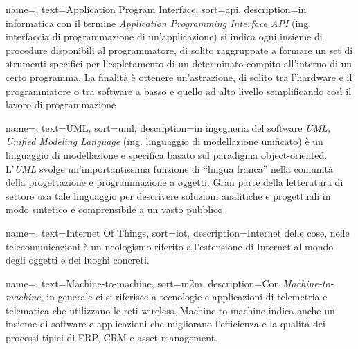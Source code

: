 
\renewcommand{\acronymname}{Acronimi e abbreviazioni}






{
    name=,
    text=Application Program Interface,
    sort=api,
    description={in informatica con il termine \emph{Application Programming Interface API} (ing. interfaccia di programmazione di un'applicazione) si indica ogni insieme di procedure disponibili al programmatore, di solito raggruppate a formare un set di strumenti specifici per l'espletamento di un determinato compito all'interno di un certo programma. La finalità è ottenere un'astrazione, di solito tra l'hardware e il programmatore o tra software a basso e quello ad alto livello semplificando così il lavoro di programmazione}
}

{
    name=,
    text=UML,
    sort=uml,
    description={in ingegneria del software \emph{UML, Unified Modeling Language} (ing. linguaggio di modellazione unificato) è un linguaggio di modellazione e specifica basato sul paradigma object-oriented. L'\emph{UML} svolge un'importantissima funzione di ``lingua franca'' nella comunità della progettazione e programmazione a oggetti. Gran parte della letteratura di settore usa tale linguaggio per descrivere soluzioni analitiche e progettuali in modo sintetico e comprensibile a un vasto pubblico}
}

{
    name=,
    text=Internet Of Things,
    sort=iot,
    description={Internet delle cose, nelle telecomunicazioni è un neologismo riferito all'estensione di Internet al mondo degli oggetti 
                e dei luoghi concreti.}
}

{
    name=,
    text=Machine-to-machine,
    sort=m2m,
    description={Con \emph{Machine-to-machine}, in generale ci si riferisce a tecnologie e applicazioni di telemetria e telematica che utilizzano le 
                reti wireless. Machine-to-machine indica anche un insieme di software e applicazioni che migliorano l'efficienza e la qualità dei 
                processi tipici di ERP, CRM e asset management.}
}
